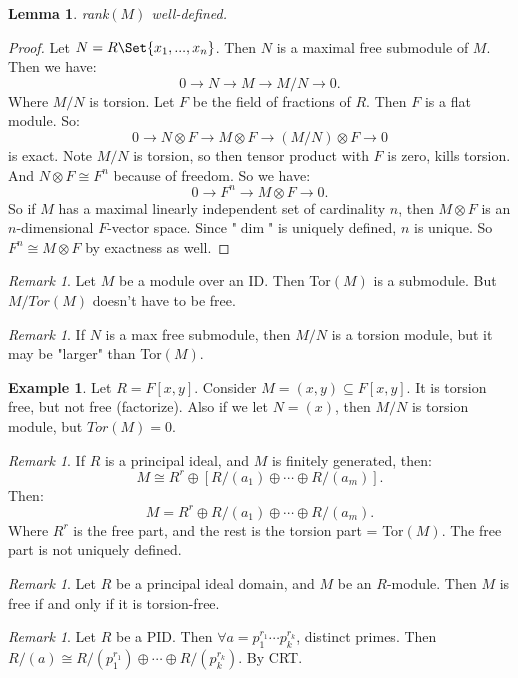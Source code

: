 \documentclass[9pt,reqno,twoside]{amsbook}
\theoremstyle{plain}
\numberwithin{section}{chapter}
\numberwithin{equation}{chapter}
\newtheorem{lem}[theorem]{Lemma}
\theoremstyle{definition}
\newtheorem{Ex}[theorem]{Example}
\theoremstyle{remark}
\newtheorem{rem}[theorem]{Remark}
\theoremstyle{plain}
\newcommand{\sub}{\subseteq}
\newcommand{\tens}{\otimes}
\begin{document}
\begin{lem}
rank$(M)$ well-defined. 
\end{lem}
\begin{proof}

Let $N = R\Set{x_1,...,x_n}$. Then $N$ is a maximal free submodule of $M$. Then we have:
$$
0 \to N \to M \to M/N \to 0.
$$
Where $M/N$ is torsion. Let $F$ be the field of fractions of $R$. Then $F$ is a flat module. So:
$$
0 \to N \tens F \to M \tens F \to (M/N) \tens F \to 0
$$
is exact. Note $M/N$ is torsion, so then tensor product with $F$ is zero, kills torsion. And $N \tens F \cong F^n$ because of freedom. 
So we have:
$$
0 \to F^n \to M \tens F \to 0.
$$
So if $M$ has a maximal linearly independent set of cardinality $n$, then $M \tens F$ is an $n$-dimensional $F$-vector space. Since "$\dim$" is uniquely defined, $n$ is unique. So $F^n \cong M \tens F$ by exactness as well. 
\end{proof}


\begin{rem}
Let $M$ be a module over an ID. Then Tor$(M)$ is a submodule. But $M/Tor(M)$ doesn't have to be free. 
\end{rem}

\begin{rem}
If $N$ is a max free submodule, then $M/N$ is a torsion module, but it may be "larger" than Tor$(M)$. 
\end{rem}

\begin{Ex}
Let $R = F[x,y]$. Consider $M = (x,y) \sub F[x,y]$. It is torsion free, but not free (factorize). Also if we let $N = (x)$, then $M/N$ is torsion module, but $Tor(M) = 0$. 
\end{Ex}

\begin{rem}
If $R$ is a principal ideal, and $M$ is finitely generated, then:
 $$
 M \cong R^r \oplus [R/(a_1) \oplus \cdots \oplus R/(a_m)].
 $$
 Then:
 $$
 M = R^r \oplus R/(a_1) \oplus \cdots \oplus R/(a_m).
 $$
 Where $R^r$ is the free part, and the rest is the torsion part = Tor$(M)$. The free part is not uniquely defined. 
\end{rem}

\begin{rem}
Let $R$ be a principal ideal domain, and $M$ be an $R$-module. Then $M$ is free if and only if it is torsion-free. 
\end{rem} 

\begin{rem}
Let $R$ be a PID. Then $\forall a = p_1^{r_1}\cdots p_k^{r_k}$, distinct primes. Then $R/(a) \cong R/(p_1^{r_1}) \oplus \cdots \oplus R/(p_k^{r_k})$. By CRT.
\end{rem}
\end{document}
